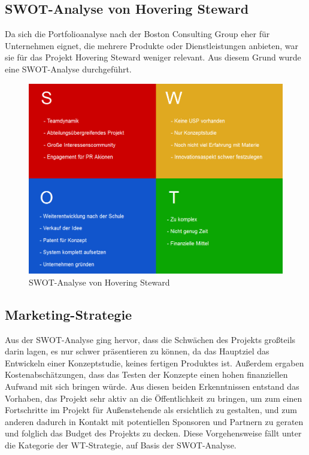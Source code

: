     \subsection*{SWOT-Analyse von Hovering Steward}
    Da sich die Portfolioanalyse nach der Boston Consulting Group eher für Unternehmen eignet, die mehrere Produkte oder Dienstleistungen anbieten, war sie für das Projekt
    Hovering Steward weniger relevant. Aus diesem Grund wurde eine SWOT-Analyse durchgeführt.

    \begin{figure}[H]
      \begin{centering}
      \includegraphics[width = 1\textwidth]{Bilder/hovi_SWOT.png}
      \par\end{centering}
      \caption{SWOT-Analyse von Hovering Steward}
      \label{hoviswot}
    \end{figure}

  \subsection{Marketing-Strategie}
  Aus der SWOT-Analyse ging hervor, dass die Schwächen des Projekts großteils darin lagen, es nur schwer präsentieren zu können, da das Hauptziel das Entwickeln
  einer Konzeptstudie, keines fertigen Produktes ist. Außerdem ergaben Kostenabschätzungen, dass das Testen der Konzepte einen hohen finanziellen Aufwand mit sich bringen
  würde. Aus diesen beiden Erkenntnissen entstand das Vorhaben, das Projekt sehr aktiv an die Öffentlichkeit zu bringen, um zum einen Fortschritte im Projekt
  für Außenstehende als ersichtlich zu gestalten, und zum anderen dadurch in Kontakt mit potentiellen Sponsoren und Partnern zu geraten und folglich das Budget des Projekts
  zu decken. Diese Vorgehensweise fällt unter die Kategorie der WT-Strategie, auf Basis der SWOT-Analyse.

